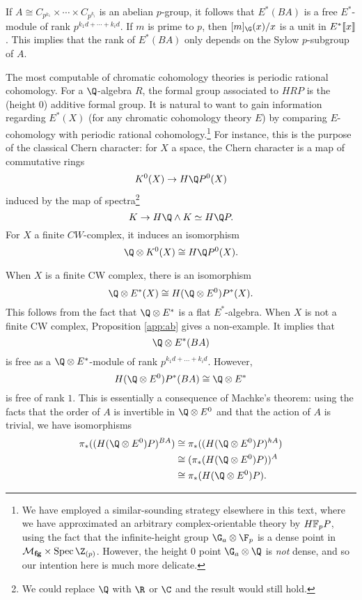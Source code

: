 If \(A \cong C_{p^{k_1}} \times \cdots \times C_{p^{k_i}}\) is an abelian \(p\)-group, it follows that \(E^*(BA)\) is a free \(E^*\)-module of rank \(p^{k_1d+\cdots + k_id}\). If \(m\) is prime to \(p\), then \([m]_{\G}(x)/x\) is a unit in \(E^*\llbracket{x}\rrbracket\). This implies that the rank of \(E^*(BA)\) only depends on the Sylow \(p\)-subgroup of \(A\).

The most computable of chromatic cohomology theories is periodic rational cohomology. For a \(\Q\)-algebra \(R\), the formal group associated to \(HRP\) is the (height \(0\)) additive formal group. It is natural to want to gain information regarding \(E^*(X)\) (for any chromatic cohomology theory \(E\)) by comparing \(E\)-cohomology with periodic rational cohomology.\footnote{We have employed a similar-sounding strategy elsewhere in this text, where we have approximated an arbitrary complex-orientable theory by \(\HFp P\), using the fact that the infinite-height group \(\G_a \otimes \F_p\) is a dense point in \(\moduli{fg} \times \Spec \Z_{(p)}\).  However, the height \(0\) point \(\G_a \otimes \Q\) is \emph{not} dense, and so our intention here is much more delicate.}  For instance, this is the purpose of the classical Chern character: for \(X\) a space, the Chern character is a map of commutative rings
\[
K^0(X) \to H\Q P^0(X)
\] 
induced by the map of spectra\footnote{We could replace \(\Q\) with \(\R\) or \(\C\) and the result would still hold.} \[K \to H\Q \wedge K \simeq H\Q P.\] For \(X\) a finite \(CW\)-complex, it induces an isomorphism
\[
\Q \otimes K^0(X) \cong H\Q P^0(X).
\]

When \(X\) is a finite CW complex, there is an isomorphism
\begin{equation*}
\Q \otimes E^*(X) \cong H(\Q \otimes E^0)P^*(X).
\end{equation*}
This follows from the fact that \(\Q \otimes E^*\) is a flat \(E^*\)-algebra. When \(X\) is not a finite CW complex, Proposition \ref{app:ab} gives a non-example. It implies that
\[
\Q \otimes E^*(BA)
\]
is free as a \(\Q \otimes E^*\)-module of rank \(p^{k_1d + \ldots + k_id}\). However, \[H(\Q \otimes E^0)P^*(BA) \cong \Q \otimes E^*\] is free of rank \(1\).  This is essentially a consequence of Machke's theorem: using the facts that the order of \(A\) is invertible in \(\Q \otimes E^0\) and that the action of \(A\) is trivial, we have isomorphisms
\begin{align*}
\pi_*((H(\Q \otimes E^0)P)^{BA}) &\cong \pi_*((H(\Q \otimes E^0)P)^{hA}) \\ &\cong (\pi_*(H(\Q \otimes E^0)P))^A \\ &\cong \pi_*(H(\Q \otimes E^0)P).
\end{align*}

